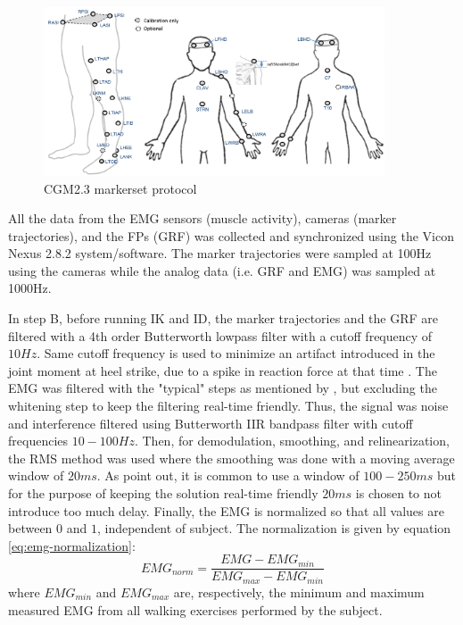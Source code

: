 \documentclass[../main.tex]{subfiles}
\begin{document}
\begin{figure}
    \centering
    \includegraphics[width=0.9\textwidth]{img/CGM23_markerset2.png}
    \caption{CGM2.3 markerset protocol}
    \label{fig:cgm23-markerset}
\end{figure}

All the data from the \ac{EMG} sensors (muscle activity), cameras (marker trajectories), and the \acp{FP} (\ac{GRF}) was collected and synchronized using the Vicon Nexus 2.8.2 system/software.
The marker trajectories were sampled at 100Hz using the cameras while the analog data (i.e. \ac{GRF} and \ac{EMG}) was sampled at 1000Hz.

In step B, before running \ac{IK} and \ac{ID}, the marker trajectories and the \ac{GRF} are filtered with a 4th order Butterworth lowpass filter with a cutoff frequency of $10Hz$. 
Same cutoff frequency is used to minimize an artifact introduced in the joint moment at heel strike, due to a spike in reaction force at that time \cite{Kristianslund2012}.
The \ac{EMG} was filtered with the "typical" steps as mentioned by \citeauthor{Clancy2016} \parencite[99]{Clancy2016}, but excluding the whitening step to keep the filtering real-time friendly.
Thus, the signal was noise and interference filtered using Butterworth IIR bandpass filter with cutoff frequencies $10-100Hz$. 
Then, for demodulation, smoothing, and relinearization, the RMS method was used where the smoothing was done with a moving average window of $20ms$. 
As \citeauthor{Clancy2016} point out, it is common to use a window of $100-250 ms$ but for the purpose of keeping the solution real-time friendly $20ms$ is chosen to not introduce too much delay.
Finally, the \ac{EMG} is normalized so that all values are between $0$ and $1$, independent of subject.
The normalization is given by equation \ref{eq:emg-normalization}:
\begin{equation}
\label{eq:emg-normalization}
    EMG_{norm} = \frac{EMG - EMG_{min}}{EMG_{max} - EMG_{min}}
\end{equation}
where $EMG_{min}$ and $EMG_{max}$ are, respectively, the minimum and maximum measured \ac{EMG} from all walking exercises performed by the subject.
\end{document}
